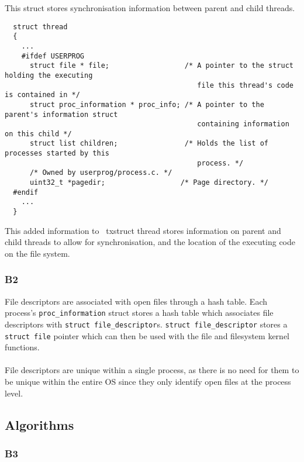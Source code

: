 \documentclass[a4wide, 11pt]{article}
\newcommand{\tab}{\hspace*{2em}}
\newcommand{\tx}{\texttt}
\begin{document}
\tab This struct stores synchronisation information between parent and child threads.

\begin{verbatim}
  struct thread
  {
    ...
    #ifdef USERPROG
      struct file * file;                  /* A pointer to the struct holding the executing 
                                              file this thread's code is contained in */
      struct proc_information * proc_info; /* A pointer to the parent's information struct
                                              containing information on this child */
      struct list children;                /* Holds the list of processes started by this
                                              process. */
      /* Owned by userprog/process.c. */
      uint32_t *pagedir;                  /* Page directory. */
  #endif
    ...
  }
\end{verbatim}

\tab This added information to \  tx{struct thread} stores information on parent and child threads to allow for synchronisation, and the location of the executing code on the file system.

\subsubsection{B2}

File descriptors are associated with open files through a hash table. Each process's \tx{proc\_information} struct stores a hash table which associates file descriptors with \tx{struct file\_descriptor}s. \tx{struct file\_descriptor} stores a \tx{struct file} pointer which can then be used with the file and filesystem kernel functions.
\\\\
File descriptors are unique within a single process, as there is no need for them to be unique within the entire OS since they only identify open files at the process level.

\subsection{Algorithms}
\subsubsection{B3}
\end{document}
